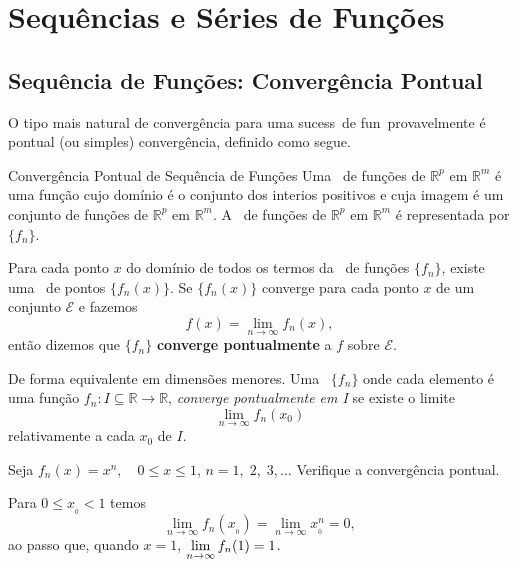 %
\chapter{Sequências e Séries de Funções}

\section{Sequência de Funções: Converg\^encia  Pontual}
O tipo mais natural de converg\^encia para uma sucess\ao\ de fun\coes\ provavelmente \'e pontual 
(ou simples) converg\^encia, definido como segue.

\begin{defic}{Convergência Pontual de Sequência de Funções}{} 
Uma \seq\ de funções de $\mathbb{R}^p$ em
$\mathbb{R}^m$ é uma função cujo domínio é o conjunto dos interios
positivos e cuja imagem é um conjunto de funções de $\mathbb{R}^p$
em $\mathbb{R}^m$. A \seq\ de funções de $\mathbb{R}^p$ em
$\mathbb{R}^m$ é representada por $\{f_n\}$.

Para cada ponto $x$ do domínio de todos os termos da \seq\ de
funções $\{f_n\}$, existe uma \seq\ de pontos $\{f_n(x)\}$. Se
$\{f_n(x)\}$ converge para cada ponto $x$ de um conjunto
$\mathcal{E}$ e fazemos
\begin{equation*}
    f(x)=\lim_{n\to \infty}f_n(x),
\end{equation*}
então dizemos que $\{f_n\}$ \textbf{converge pontualmente}  a $f$
sobre $\mathcal{E}$.
\end{defic}

De forma equivalente em dimensões menores. Uma \seq\ $\{f_n\}$
onde cada elemento é uma função $f_n\colon I\subseteq
\mathbb{R}\to \mathbb{R}$, \textit{converge pontualmente em I} se
existe o limite
\begin{equation*}
  \lim_{n\to\infty}f_n(x_{0})
\end{equation*}
relativamente a cada $x_{0}$ de $I$.


\begin{exer} 
Seja $f_n(x) =x^n,\quad 0\leq x\leq 1$, $n= 1,\; 2,\;  3,\ldots$
Verifique a convergência pontual.
\end{exer}

\solo Para $0\leq x_{_{0}}<1$ temos
\begin{equation*}
  \lim_{n\to\infty} f_n(x_{_{0}}) = \lim_{n\to\infty} x_{_{0}}^n=0,
\end{equation*}
ao passo que, quando $x =1$, $\displaystyle{\lim_{n\to\infty}f_n(1) = 1}$.

